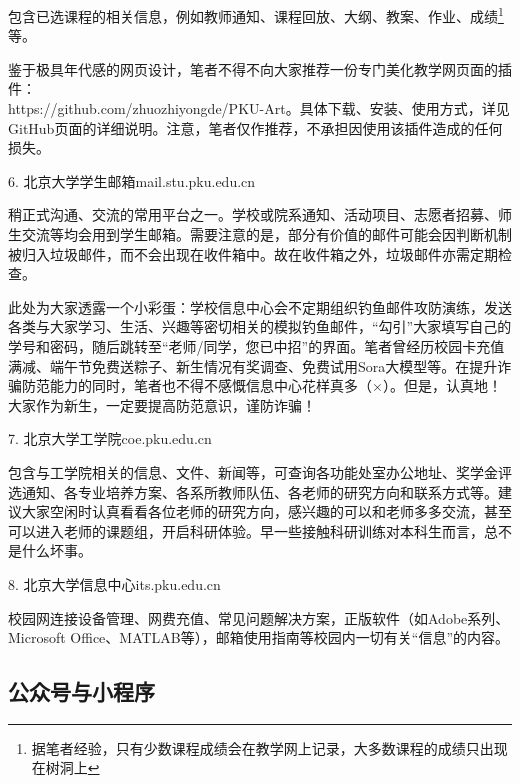 \documentclass[11pt,oneside]{book}
\begin{document}
包含已选课程的相关信息，例如教师通知、课程回放、大纲、教案、作业、成绩\footnote{据笔者经验，只有少数课程成绩会在教学网上记录，大多数课程的成绩只出现在树洞上}等。

鉴于极具年代感的网页设计，笔者不得不向大家推荐一份专门美化教学网页面的插件：\\https://github.com/zhuozhiyongde/PKU-Art。具体下载、安装、使用方式，详见GitHub页面的详细说明。注意，笔者仅作推荐，不承担因使用该插件造成的任何损失。

\vspace{10pt}

6. 北京大学学生邮箱\quad mail.stu.pku.edu.cn 

稍正式沟通、交流的常用平台之一。学校或院系通知、活动项目、志愿者招募、师生交流等均会用到学生邮箱。需要注意的是，部分有价值的邮件可能会因判断机制被归入垃圾邮件，而不会出现在收件箱中。故在收件箱之外，垃圾邮件亦需定期检查。

此处为大家透露一个小彩蛋：学校信息中心会不定期组织钓鱼邮件攻防演练，发送各类与大家学习、生活、兴趣等密切相关的模拟钓鱼邮件，“勾引”大家填写自己的学号和密码，随后跳转至“老师/同学，您已中招”的界面。笔者曾经历校园卡充值满减、端午节免费送粽子、新生情况有奖调查、免费试用Sora大模型等。在提升诈骗防范能力的同时，笔者也不得不感慨信息中心花样真多（$\times$）。但是，认真地！大家作为新生，一定要提高防范意识，谨防诈骗！

\vspace{10pt}

7. 北京大学工学院\quad coe.pku.edu.cn

包含与工学院相关的信息、文件、新闻等，可查询各功能处室办公地址、奖学金评选通知、各专业培养方案、各系所教师队伍、各老师的研究方向和联系方式等。建议大家空闲时认真看看各位老师的研究方向，感兴趣的可以和老师多多交流，甚至可以进入老师的课题组，开启科研体验。早一些接触科研训练对本科生而言，总不是什么坏事。

\vspace{10pt}

8. 北京大学信息中心\quad its.pku.edu.cn

校园网连接设备管理、网费充值、常见问题解决方案，正版软件（如Adobe系列、Microsoft Office、MATLAB等），邮箱使用指南等校园内一切有关“信息”的内容。

\newpage

\subsection{公众号与小程序}
\end{document}
